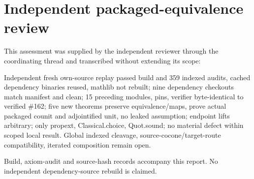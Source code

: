 \documentclass{article}
\begin{document}
\section*{Independent packaged-equivalence review}
This assessment was supplied by the independent reviewer through the coordinating thread and transcribed without extending its scope:

Independent fresh own-source replay passed build and 359 indexed audits, cached dependency binaries reused, mathlib not rebuilt; nine dependency checkouts match manifest and clean; 15 preceding modules, pins, verifier byte-identical to verified \#162; five new theorems preserve equivalence/maps, prove actual packaged counit and adjointified unit, no leaked assumption; endpoint lifts arbitrary; only propext, Classical.choice, Quot.sound; no material defect within scoped local result. Global indexed cleavage, source-cocone/target-route compatibility, iterated composition remain open.

Build, axiom-audit and source-hash records accompany this report. No independent dependency-source rebuild is claimed.
\end{document}
